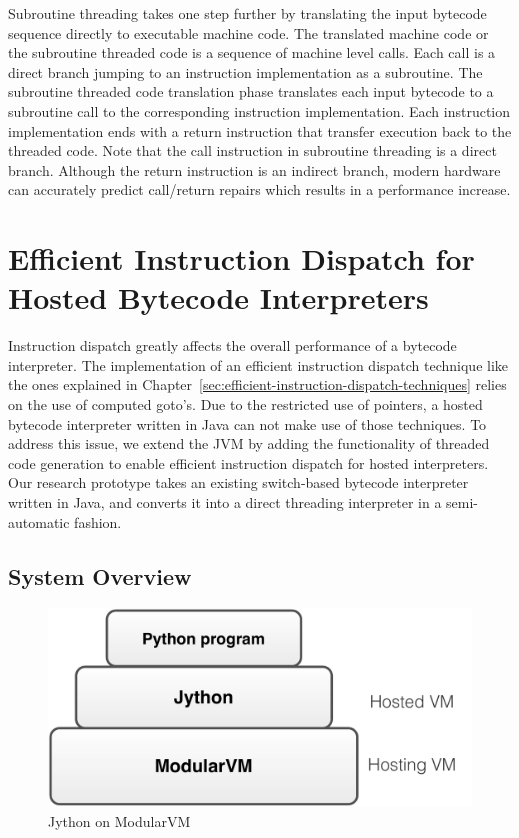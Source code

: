 Subroutine threading takes one step further by translating the input bytecode sequence directly to executable machine code.
The translated machine code or the subroutine threaded code is a sequence of machine level calls.
Each call is a direct branch jumping to an instruction implementation as a subroutine.
The subroutine threaded code translation phase translates each input bytecode to a subroutine call to the corresponding instruction implementation.
Each instruction implementation ends with a return instruction that transfer execution back to the threaded code.
Note that the call instruction in subroutine threading is a direct branch.
Although the return instruction is an indirect branch, modern hardware can accurately predict call/return repairs which results in a performance increase.

\section{Efficient Instruction Dispatch for Hosted Bytecode Interpreters}

Instruction dispatch greatly affects the overall performance of a bytecode interpreter.
The implementation of an efficient instruction dispatch technique like the ones explained in Chapter~\ref{sec:efficient-instruction-dispatch-techniques}
relies on the use of computed goto's.
Due to the restricted use of pointers, a hosted bytecode interpreter written in Java can not make use of those techniques.
To address this issue, we extend the JVM by adding the functionality of threaded code generation to enable efficient instruction dispatch for hosted interpreters.
Our research prototype takes an existing switch-based bytecode interpreter written in Java, and converts it into a direct threading interpreter in a semi-automatic fashion.

\subsection{System Overview}
\label{sec:system-overview}

\begin{figure}[th]
\centering
\includegraphics[scale=.3]{figures/ch2-jython-on-modularvm.pdf}
\caption{Jython on ModularVM}
\label{fig:jython-on-modularvm}
\end{figure}

